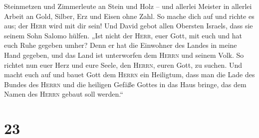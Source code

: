 Steinmetzen und Zimmerleute an Stein und Holz -- und allerlei Meister in
allerlei Arbeit  an Gold, Silber, Erz und Eisen ohne
Zahl. So mache dich auf und richte es aus; der \textsc{Herr} wird mit
dir sein!  Und David gebot allen Obersten Israels, dass
sie seinem Sohn Salomo hülfen.  „Ist nicht der
\textsc{Herr}, euer Gott, mit euch und hat euch Ruhe gegeben umher? Denn
er hat die Einwohner des Landes in meine Hand gegeben, und das Land ist
unterworfen dem \textsc{Herrn} und seinem Volk.  So
richtet nun euer Herz und eure Seele, den \textsc{Herrn}, euren Gott, zu
suchen. Und macht euch auf und bauet Gott dem \textsc{Herrn} ein
Heiligtum, dass man die Lade des Bundes des \textsc{Herrn} und die
heiligen Gefäße Gottes in das Haus bringe, das dem Namen des
\textsc{Herrn} gebaut soll werden.``

\hypertarget{section-22}{%
\section{23}\label{section-22}}

